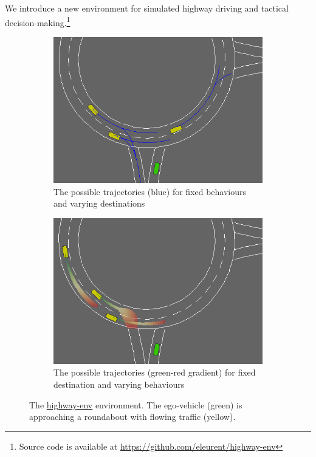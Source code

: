 \documentclass{article}
\begin{document}
\vspace{-1mm}
We introduce a new environment for simulated highway driving and tactical decision-making.\footnote{Source code is available at \href{https://github.com/eleurent/highway-env}{https://github.com/eleurent/highway-env}}

\begin{figure}[tp]
\centering
\begin{subfigure}[t]{0.49\textwidth}
    \centering
    \includegraphics[width=\textwidth]{img/he-discrete.png}
    \caption{The possible trajectories (blue) for fixed behaviours and varying destinations}
    \label{highway-env-discrete}
\end{subfigure}
\begin{subfigure}[t]{0.49\textwidth}
    \centering
    \includegraphics[width=\textwidth]{img/he-interval.png}

    \caption{The possible trajectories (green-red gradient) for fixed destination and varying behaviours}
    \label{highway-env-interval}
    \end{subfigure}
    
\caption{The \href{https://github.com/eleurent/highway-env}{highway-env} environment. The ego-vehicle (green) is approaching a roundabout with flowing traffic (yellow).}
\label{highway-env}

\vspace{-5mm}
\end{figure}
\end{document}
